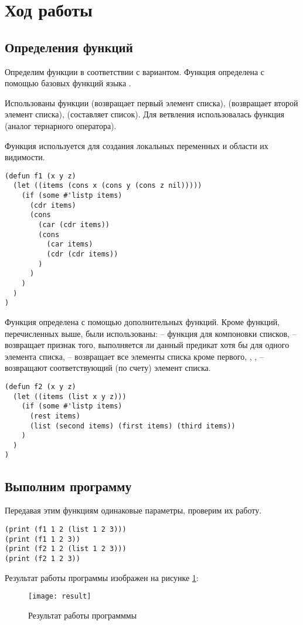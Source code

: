 \documentclass[a4paper,14pt]{extarticle}
\begin{document}
\section{Ход работы}
\subsection{Определения функций}
Определим функции в соответствии с вариантом. Функция  определена с
помощью базовых функций языка . 

Использованы функции  (возвращает первый элемент списка), 
(возвращает второй элемент списка),  (составляет список). Для
ветвления использовалась функция  (аналог тернарного оператора).

Функция  используется для создания локальных переменных и области их
видимости.
\begin{lstlisting}
(defun f1 (x y z)
  (let ((items (cons x (cons y (cons z nil)))))
    (if (some #'listp items)
      (cdr items)
      (cons
        (car (cdr items))
        (cons
          (car items)
          (cdr (cdr items))
        )
      )
    )
  )
)
\end{lstlisting}

Функция  определена с помощью дополнительных функций. Кроме функций,
перечисленных выше, были использованы:  -- функция для компоновки
списков,  -- возвращает признак того, выполняется ли данный предикат
хотя бы для одного элемента списка,  -- возвращает все элементы
списка кроме первого, , ,  -- возвращают
соответствующий (по счету) элемент списка.
\begin{lstlisting}
(defun f2 (x y z)
  (let ((items (list x y z)))
    (if (some #'listp items)
      (rest items)
      (list (second items) (first items) (third items))
    )
  )
)
\end{lstlisting}

\subsection{Выполним программу}
Передавая этим функциям одинаковые параметры, проверим их работу.
\begin{lstlisting}
(print (f1 1 2 (list 1 2 3)))
(print (f1 1 2 3))
(print (f2 1 2 (list 1 2 3)))
(print (f2 1 2 3))
\end{lstlisting}

Результат работы программы изображен на рисунке \ref{fig:result}:
\begin{figure}[H]
    \centering
    \texttt{[image: result]}
    \caption{Результат работы программмы}
    \label{fig:result}
\end{figure}
\end{document}

